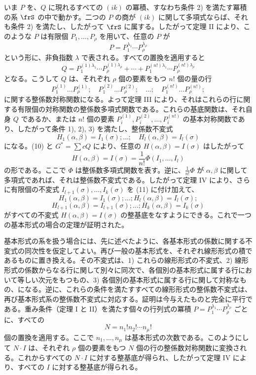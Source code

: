 \documentclass[11pt]{article}
\begin{document}
いま \(P\) を、\(Q\) に現れるすべての \((ik)\) の冪積、すなわち条件 2) を満たす冪積の系 \(\frS\) の中で動かす。二つの \(P\) の商が \((ik)\) に関して多項式ならば、それも条件 2) を満たし、したがって \(\frS\) に属する。したがって定理 II により、このような \(P\) は有限個 \(P_1,\ldots,P_\rho\) を用いて、任意の \(P\) が
\[
        P=P_1^{\lambda_1}\cdots P_\rho^{\lambda_\rho}
\]
という形に、非負指数 \(\lambda\) で表される。すべての置換を適用すると
\[
        Q=
        P_1^{(1)\lambda_1}\cdots P_\rho^{(1)\lambda_\rho}
        +\cdots+
        P_1^{(n!)\lambda_1}\cdots P_\rho^{(n!)\lambda_\rho}
\]
となる。こうして \(Q\) は、それぞれ \(\rho\) 個の要素をもつ \(n!\) 個の量の行
\[
        P_1^{(1)}\ldots P_\rho^{(1)};
        \quad
        P_1^{(2)}\ldots P_\rho^{(2)};
        \quad \ldots;\quad
        P_1^{(n!)}\ldots P_\rho^{(n!)};
\]
に関する整係数対称関数になる。よって定理 III により、それはこれらの行に関する有限個の対称関数の整係数多項式関数である。これらの基底関数は、それ自身 \(Q\) であるか、または \(n!\) 個の要素 \(P_i^{(1)},P_i^{(2)},\ldots,P_i^{(n!)}\) の基本対称関数であり、したがって条件 1), 2), 3) を満たし、整係数不変式
\begin{equation}
        H_1(\alpha,\beta)=I_1(\sigma);\ldots;\quad
        H_l(\alpha,\beta)=I_l(\sigma)
\end{equation}
になる。(10) と \(G^*=\sum cQ\) により、任意の \(H(\alpha,\beta)=I(\sigma)\) はしたがって
\[
        H(\alpha,\beta)=I(\sigma)=\frac1{n!}\Phi(I_1,\ldots,I_l)
\]
の形である。ここで \(\Phi\) は整係数多項式関数を表す。逆に、\(\frac1{n!}\Phi\) が \(\alpha,\beta\) に関して多項式であれば、それは整係数不変式である。したがって定理 IV により、さらに有限個の不変式 \(I_{l+1}(\sigma),\ldots,I_k(\sigma)\) を (11) に付け加えて、
\[
        H_1(\alpha,\beta)=I_1(\sigma);\ldots;H_l(\alpha,\beta)=I_l(\sigma);
\]
\[
        H_{l+1}(\alpha,\beta)=I_{l+1}(\sigma);\ldots;H_k(\alpha,\beta)=I_k(\sigma)
\]
がすべての不変式 \(H(\alpha,\beta)=I(\sigma)\) の整基底をなすようにできる。これで一つの基本形式の場合の定理が証明された。

基本形式の系を扱う場合には、先に述べたように、各基本形式の係数に関する不変式の同次性を仮定してよい。再び一般の基本形式を、それぞれ線形形式の積であるものに置き換える。その不変式は、1) これらの線形形式の不変式、2) 線形形式の係数からなる行に関して別々に同次で、各個別の基本形式に属する行において等しい次元をもつもの、3) 各個別の基本形式に属する行に関して対称なもの、になる。逆に、これらの条件を満たすすべての線形形式の整係数不変式は、再び基本形式系の整係数不変式に対応する。証明は今与えたものと完全に平行である。重み条件（定理 I と II）を満たす個々の行列式の冪積 \(P=P_1^{\lambda_1}\cdots P_\rho^{\lambda_\rho}\) ごとに、すべての
\[
        N=n_1!n_2!\cdots n_\mu!
\]
個の置換を適用する。ここで \(n_1,\ldots,n_\mu\) は基本形式の次数である。このようにして \(N\cdot I\) は、それぞれ \(\rho\) 個の要素をもつ \(N\) 個の行の整係数対称関数に変換される。これからすべての \(N\cdot I\) に対する整基底が得られ、したがって定理 IV により、すべての \(I\) に対する整基底が得られる。
\end{document}
